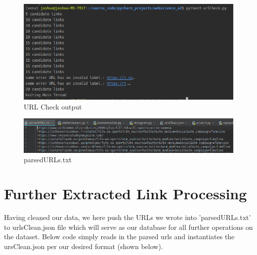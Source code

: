 \documentclass[11pt]{article}
\begin{document}
	\begin{figure}[h!]
		\includegraphics[scale=0.5]{resources/urlCheckConsole.png}
		\caption{URL Check output}
	\end{figure}
	\begin{figure}[h!]
		\includegraphics[scale=0.4]{resources/urlCheckOut.png}
		\caption{parsedURLs.txt}
	\end{figure}
	\section{Further Extracted Link Processing }
	\hspace{10mm} Having cleaned our data, we here push the URLs we wrote into 'parsedURLs.txt' to urlsClean.json file which will serve as our database for all further operations on the dataset. Below code simply reads in the parsed urls and instantiates the ursClean.json per our desired format (shown below). 
\end{document}
